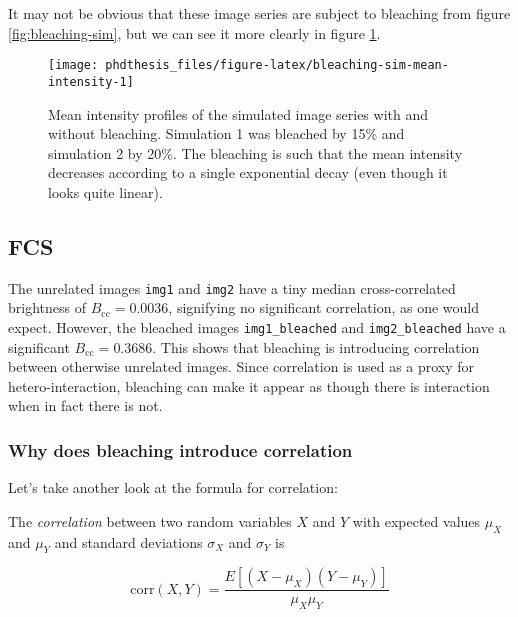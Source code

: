 \documentclass[12pt,]{book}
\theoremstyle{definition}
\theoremstyle{definition}
\theoremstyle{definition}
\theoremstyle{remark}
\let\BeginKnitrBlock\begin \let\EndKnitrBlock\end
\begin{document}
It may not be obvious that these image series are subject to bleaching
from figure \ref{fig:bleaching-sim}, but we can see it more clearly in
figure \ref{fig:bleaching-sim-mean-intensity}.







\begin{figure}

\texttt{[image: phdthesis\_files/figure-latex/bleaching-sim-mean-intensity-1]} \hfill{}

\caption{Mean intensity profiles of
the simulated image series with and without bleaching. Simulation 1 was
bleached by 15\% and simulation 2 by 20\%. The bleaching is such that
the mean intensity decreases according to a single exponential decay
(even though it looks quite linear).}\label{fig:bleaching-sim-mean-intensity}
\end{figure}

\subsection{FCS}\label{fcs}

The unrelated images \texttt{img1} and \texttt{img2} have a tiny median
cross-correlated brightness of \(B_\text{cc} = 0.0036\), signifying no
significant correlation, as one would expect. However, the bleached
images \texttt{img1\_bleached} and \texttt{img2\_bleached} have a
significant \(B_\text{cc} = 0.3686\). This shows that bleaching is
introducing correlation between otherwise unrelated images. Since
correlation is used as a proxy for hetero-interaction, bleaching can
make it appear as though there is interaction when in fact there is not.

\subsubsection{Why does bleaching introduce
correlation}\label{why-does-bleaching-introduce-correlation}

Let's take another look at the formula for correlation:

\BeginKnitrBlock{definition}[FCS]
\protect\hypertarget{def:unnamed-chunk-31}{}{\label{def:unnamed-chunk-31}
\iffalse (FCS) \fi{} }The \emph{correlation} between two random
variables \(X\) and \(Y\) with expected values \(\mu_X\) and \(\mu_Y\)
and standard deviations \(\sigma_X\) and \(\sigma_Y\) is

\begin{equation}
\text{corr}(X, Y) = \frac{E[(X - \mu_X)(Y - \mu_Y)]}{\mu_X \mu_Y}
\label{eq:FCSCorrelationDuplicate}
\end{equation}
\EndKnitrBlock{definition}
\end{document}
